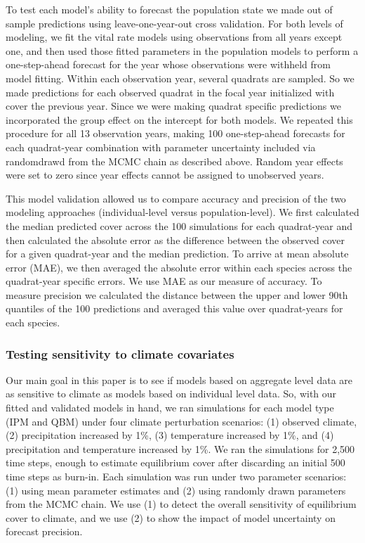 \documentclass[12pt,]{article}
\begin{document}
To test each model's ability to forecast the population state we made
out of sample predictions using leave-one-year-out cross validation. For
both levels of modeling, we fit the vital rate models using observations
from all years except one, and then used those fitted parameters in the
population models to perform a one-step-ahead forecast for the year
whose observations were withheld from model fitting. Within each
observation year, several quadrats are sampled. So we made predictions
for each observed quadrat in the focal year initialized with cover the
previous year. Since we were making quadrat specific predictions we
incorporated the group effect on the intercept for both models. We
repeated this procedure for all 13 observation years, making 100
one-step-ahead forecasts for each quadrat-year combination with
parameter uncertainty included via randomdrawd from the MCMC chain as
described above. Random year effects were set to zero since year effects
cannot be assigned to unobserved years.

This model validation allowed us to compare accuracy and precision of
the two modeling approaches (individual-level versus population-level).
We first calculated the median predicted cover across the 100
simulations for each quadrat-year and then calculated the absolute error
as the difference between the observed cover for a given quadrat-year
and the median prediction. To arrive at mean absolute error (MAE), we
then averaged the absolute error within each species across the
quadrat-year specific errors. We use MAE as our measure of accuracy. To
measure precision we calculated the distance between the upper and lower
90th quantiles of the 100 predictions and averaged this value over
quadrat-years for each species.

\subsubsection{Testing sensitivity to climate
covariates}\label{testing-sensitivity-to-climate-covariates}

Our main goal in this paper is to see if models based on aggregate level
data are as sensitive to climate as models based on individual level
data. So, with our fitted and validated models in hand, we ran
simulations for each model type (IPM and QBM) under four climate
perturbation scenarios: (1) observed climate, (2) precipitation
increased by 1\%, (3) temperature increased by 1\%, and (4)
precipitation and temperature increased by 1\%. We ran the simulations
for 2,500 time steps, enough to estimate equilibrium cover after
discarding an initial 500 time steps as burn-in. Each simulation was run
under two parameter scenarios: (1) using mean parameter estimates and
(2) using randomly drawn parameters from the MCMC chain. We use (1) to
detect the overall sensitivity of equilibrium cover to climate, and we
use (2) to show the impact of model uncertainty on forecast precision.
\end{document}
